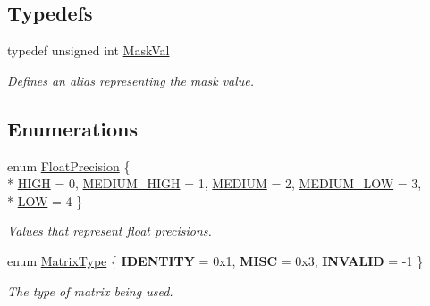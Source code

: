 \subsection*{Typedefs}
\begin{DoxyCompactItemize}
\item 
\hypertarget{group___scalar_math_consts_gad991473bd51363f9743013730e68751a}{}typedef unsigned int \hyperlink{group___scalar_math_consts_gad991473bd51363f9743013730e68751a}{Mask\+Val}\label{group___scalar_math_consts_gad991473bd51363f9743013730e68751a}

\begin{DoxyCompactList}\small\item\em Defines an alias representing the mask value. \end{DoxyCompactList}\end{DoxyCompactItemize}
\subsection*{Enumerations}
\begin{DoxyCompactItemize}
\item 
enum \hyperlink{group___scalar_math_consts_gae1c17f54b4cd35725ae7e4d54d5e8b8f}{Float\+Precision} \{ \\*
\hyperlink{group___scalar_math_consts_ggae1c17f54b4cd35725ae7e4d54d5e8b8fad850adf6415a0ab37b1c9fe6d3a50592}{H\+I\+G\+H} = 0, 
\hyperlink{group___scalar_math_consts_ggae1c17f54b4cd35725ae7e4d54d5e8b8faafc62be75ff50981d67b4fe3601020b3}{M\+E\+D\+I\+U\+M\+\_\+\+H\+I\+G\+H} = 1, 
\hyperlink{group___scalar_math_consts_ggae1c17f54b4cd35725ae7e4d54d5e8b8faae1748fe897ef72c65a32afb59edd9e9}{M\+E\+D\+I\+U\+M} = 2, 
\hyperlink{group___scalar_math_consts_ggae1c17f54b4cd35725ae7e4d54d5e8b8fab09c406decb8599d2aef4f9a60b7d46b}{M\+E\+D\+I\+U\+M\+\_\+\+L\+O\+W} = 3, 
\\*
\hyperlink{group___scalar_math_consts_ggae1c17f54b4cd35725ae7e4d54d5e8b8fa373b1e7676b2164a2da51003b901df10}{L\+O\+W} = 4
 \}
\begin{DoxyCompactList}\small\item\em Values that represent float precisions. \end{DoxyCompactList}\end{DoxyCompactItemize}
{\bf }\par
\begin{DoxyCompactItemize}
\item 
\hypertarget{group___s_i_s_d_mat_math_ga6c8951c82aec5015dd6806affb4c8d03}{}enum \hyperlink{group___s_i_s_d_mat_math_ga6c8951c82aec5015dd6806affb4c8d03}{Matrix\+Type} \{ {\bfseries I\+D\+E\+N\+T\+I\+T\+Y} = 0x1, 
{\bfseries M\+I\+S\+C} = 0x3, 
{\bfseries I\+N\+V\+A\+L\+I\+D} = -\/1
 \}\label{group___s_i_s_d_mat_math_ga6c8951c82aec5015dd6806affb4c8d03}

\begin{DoxyCompactList}\small\item\em The type of matrix being used. \end{DoxyCompactList}\end{DoxyCompactItemize}

